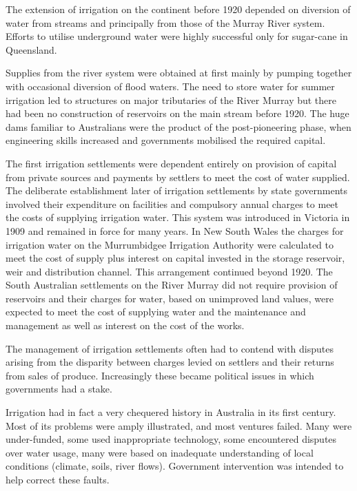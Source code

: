 The extension of irrigation on the continent before 1920 depended on
diversion of water from streams and principally from those of the
Murray River system.  Efforts to utilise underground water were highly
successful only for sugar-cane in Queensland.

Supplies from the river system were obtained at first mainly by
pumping together with occasional diversion of flood waters.  The need
to store water for summer irrigation led to structures on major
tributaries of the River Murray but there had been no construction of
reservoirs on the main stream before 1920. The huge dams familiar to
Australians were the product of the post-pioneering phase, when
engineering skills increased and governments mobilised the required
capital.

\bigskip\noindent
The first irrigation settlements were dependent entirely on provision
of capital from private sources and payments by settlers to meet the
cost of water supplied.  The deliberate establishment later of
irrigation settlements by state governments involved their expenditure
on facilities and compulsory annual charges to meet the costs of
supplying irrigation water.  This system was introduced in Victoria in
1909 and remained in force for many years.  In New South Wales the
charges for irrigation water on the Murrumbidgee Irrigation Authority
were calculated to meet the cost of supply plus interest on capital
invested in the storage reservoir, weir and distribution channel.
This arrangement continued beyond 1920.  The South Australian
settlements on the River Murray did not require provision of
reservoirs and their charges for water, based on unimproved land
values, were expected to meet the cost of supplying water and the
maintenance and management as well as interest on the cost of the
works.

The management of irrigation settlements often had to contend with
disputes arising from the disparity between charges levied on settlers
and their returns from sales of produce. Increasingly these became
political issues in which governments had a stake.

\bigskip\noindent
Irrigation had in fact a very chequered history in Australia in its
first century. Most of its problems were amply illustrated, and most
ventures failed. Many were under-funded, some used inappropriate
technology, some encountered disputes over water usage, many were
based on inadequate understanding of local conditions (climate, soils,
river flows). Government intervention was intended to help correct
these faults.

